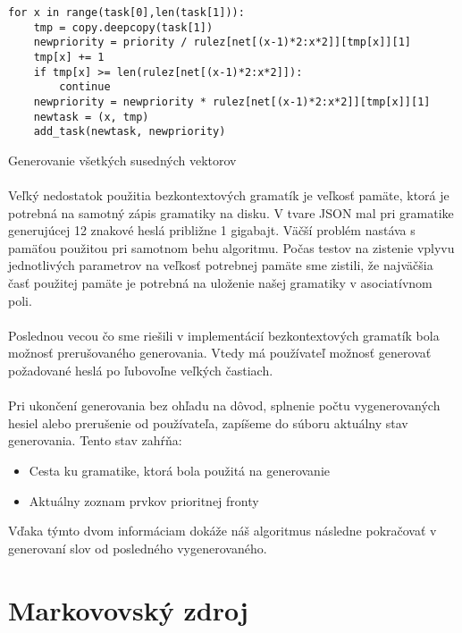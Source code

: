\begin{listing}
\begin{verbatim}
for x in range(task[0],len(task[1])):
	tmp = copy.deepcopy(task[1])
	newpriority = priority / rulez[net[(x-1)*2:x*2]][tmp[x]][1]
	tmp[x] += 1
	if tmp[x] >= len(rulez[net[(x-1)*2:x*2]]):
		continue
	newpriority = newpriority * rulez[net[(x-1)*2:x*2]][tmp[x]][1]
	newtask = (x, tmp)
	add_task(newtask, newpriority)
\end{verbatim}
\caption{Generovanie všetkých susedných vektorov}
\label{lst:generujSusedov}
\end{listing}

\paragraph{}
Veľký nedostatok použitia bezkontextových gramatík je veľkosť pamäte, ktorá je potrebná na samotný zápis gramatiky na disku. V tvare JSON mal pri gramatike generujúcej 12 znakové heslá približne 1 gigabajt. Väčší problém nastáva s pamäťou použitou pri samotnom behu algoritmu. Počas testov na zistenie vplyvu jednotlivých parametrov na veľkosť potrebnej pamäte sme zistili, že najväčšia časť použitej pamäte je potrebná na uloženie našej gramatiky v asociatívnom poli.

\paragraph{}
Poslednou vecou čo sme riešili v implementácií bezkontextových gramatík bola možnosť prerušovaného generovania. Vtedy má používateľ možnosť generovať požadované heslá po ľubovoľne veľkých častiach.

\paragraph{}
Pri ukončení generovania bez ohľadu na dôvod, splnenie počtu vygenerovaných hesiel alebo prerušenie od používateľa, zapíšeme do súboru aktuálny stav generovania. Tento stav zahŕňa:
\begin{itemize}
	\item Cesta ku gramatike, ktorá bola použitá na generovanie
	\item Aktuálny zoznam prvkov prioritnej fronty
\end{itemize}
Vďaka týmto dvom informáciam dokáže náš algoritmus následne pokračovať v generovaní slov od posledného vygenerovaného.

\section{Markovovský zdroj}
\label{sec:Markov}
